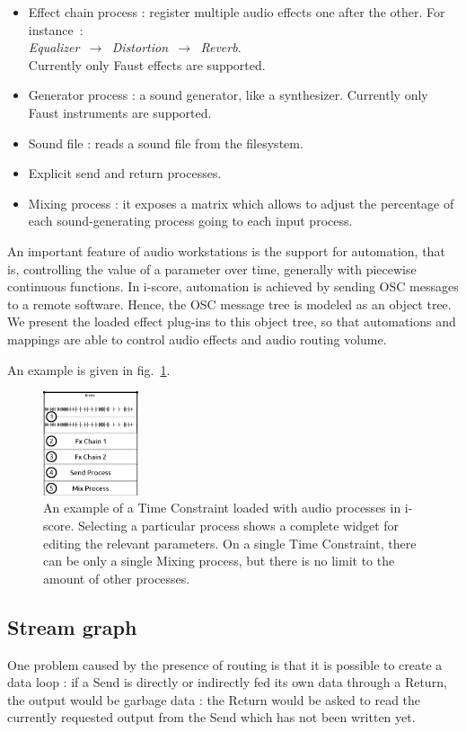 \documentclass{article}
\begin{document}
\begin{itemize}
	\item Effect chain process : register multiple audio effects one after the other. 
	For instance~:~\\ \emph{ Equalizer $\,\to\,$ Distortion $\,\to\,$ Reverb}. ~\\
	Currently only Faust effects are supported.
	\item Generator process : a sound generator, like a synthesizer. 
	Currently only Faust instruments are supported.
	\item Sound file : reads a sound file from the filesystem.
	\item Explicit send and return processes.
	\item Mixing process : it exposes a matrix which allows to adjust the percentage of each sound-generating process going to each input process.
\end{itemize}

An important feature of audio workstations is the support for automation, that is, 
controlling the value of a parameter over time, generally with piecewise continuous functions.
In i-score, automation is achieved by sending OSC messages to a remote software.
Hence, the OSC message tree is modeled as an object tree.
We present the loaded effect plug-ins to this object tree, so that automations 
and mappings are able to control audio effects and audio routing volume.

An example is given in fig.~\ref{fig.iscoreconstraint}.
\begin{figure}
	\centering
	\includegraphics[width=0.25\textwidth]{figures/iscore1.eps}
	\caption{An example of a Time Constraint loaded with audio processes in i-score. 
		Selecting a particular process shows a complete widget for editing the relevant parameters. On a single Time Constraint, there can be only a single Mixing process, but there is no limit to the amount of other processes.}
	\label{fig.iscoreconstraint}
\end{figure}
\subsection{Stream graph}
One problem caused by the presence of routing is that it is possible 
to create a data loop : if a Send is directly or indirectly fed its own data through a Return, 
the output would be garbage data : the Return would be asked to read 
the currently requested output from the Send which has not been written yet.
\end{document}
